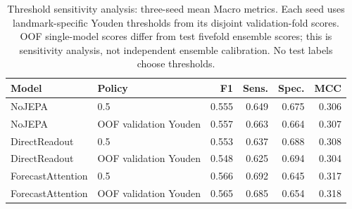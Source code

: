 \begin{table}[t]
\centering
\small
\caption{Threshold sensitivity analysis: three-seed mean Macro metrics. Each seed uses landmark-specific Youden thresholds from its disjoint validation-fold scores. OOF single-model scores differ from test fivefold ensemble scores; this is sensitivity analysis, not independent ensemble calibration. No test labels choose thresholds.}
\label{tab:extended_threshold}
\begin{tabular}{llrrrr}
\toprule
Model & Policy & F1 & Sens. & Spec. & MCC \\
\midrule
NoJEPA & 0.5 & 0.555 & 0.649 & 0.675 & 0.306 \\
NoJEPA & OOF validation Youden & 0.557 & 0.663 & 0.664 & 0.307 \\
\midrule
DirectReadout & 0.5 & 0.553 & 0.637 & 0.688 & 0.308 \\
DirectReadout & OOF validation Youden & 0.548 & 0.625 & 0.694 & 0.304 \\
\midrule
ForecastAttention & 0.5 & 0.566 & 0.692 & 0.645 & 0.317 \\
ForecastAttention & OOF validation Youden & 0.565 & 0.685 & 0.654 & 0.318 \\
\bottomrule
\end{tabular}
\end{table}
